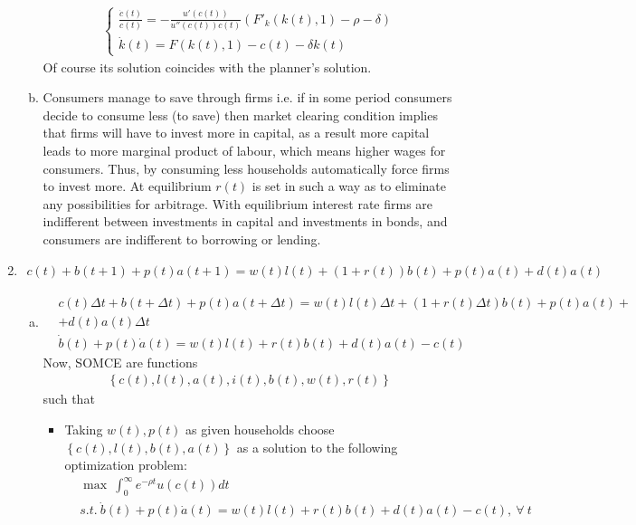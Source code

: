 \documentclass[a4paper]{article}
\begin{document}
\begin{enumerate}[1.]
\begin{enumerate}[(a)]
	\begin{align*}
	\begin{cases}
	\frac{\dot{c}(t)}{c(t)} = -\frac{u'(c(t))}{u''(c(t))c(t)}(F'_k(k(t), 1) - \rho - \delta)\\
	\dot{k}(t) = F(k(t), 1) - c(t) - \delta k(t)
	\end{cases}
	\end{align*}	
	Of course its solution coincides with the planner's solution.
	\item Consumers manage to save through firms i.e. if in some period consumers decide to consume less (to save) then market clearing condition implies that firms will have to invest more in capital, as a result more capital leads to more marginal product of labour, which means higher wages for consumers. Thus, by consuming less households automatically force firms to invest more. At equilibrium $r(t)$ is set in such a way as to eliminate any possibilities for arbitrage. With equilibrium interest rate firms are indifferent between investments in capital and investments in bonds, and consumers are indifferent to borrowing or lending.
	\end{enumerate}
	\item 
	\begin{align*}
	c(t) + b(t + 1) + p(t) a(t + 1) = w(t)l(t) + (1 + r (t)) b(t) + p(t) a(t) + d(t)a(t)
	\end{align*}
	\begin{enumerate}[(a)]
		\item 
		\begin{align*}
		&c(t)\Delta t + b(t + \Delta t) + p(t)a(t + \Delta t) = w(t)l(t)\Delta t + (1 + r(t)\Delta t)b(t) + p(t)a(t) + \\
		&+d(t)a(t)\Delta t\\
		&\dot{b}(t) + p(t)\dot{a}(t) = w(t)l(t) + r(t)b(t) + d(t)a(t) - c(t)
		\end{align*}
		Now, SOMCE are functions
		\begin{align*}
		\left\{c(t), l(t), a(t), i(t), b(t), w(t), r(t)\right\}
		\end{align*}
		such that
		\begin{itemize}
			\item Taking $w(t), p(t)$ as given households choose $\left\{c(t), l(t), b(t), a(t)\right\}$ as a solution to the following optimization problem:
			\begin{align*}
			&\max\ \int_{0}^{\infty} e^{-\rho t}u(c(t))dt\\
			&s.t.\ \dot{b}(t) + p(t)\dot{a}(t) = w(t)l(t) + r(t)b(t) + d(t)a(t) - c(t),\ \forall\ t\\

\end{align*}
\end{itemize}
\end{enumerate}
\end{enumerate}
\end{document}
